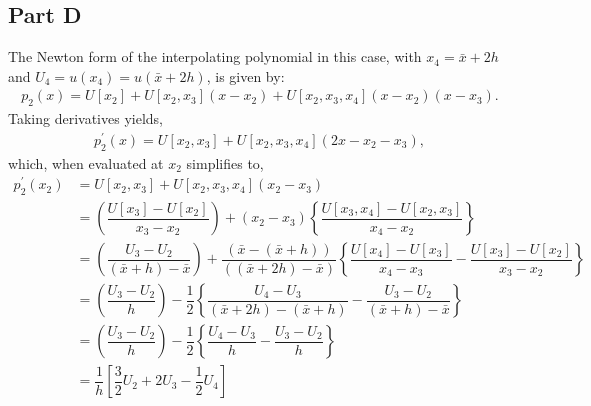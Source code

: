 \documentclass[12pt]{article}
\newcommand{\xbar}{\bar{x}}
\begin{document}
\subsection*{Part D}
The Newton form of the interpolating polynomial in this case, with $x_{4} = \xbar+2h$ and $U_{4} = u(x_{4}) = u(\xbar+2h)$, is given by:
\begin{align}
    p_{2}(x) = U[x_{2}] + U[x_{2}, x_{3}](x-x_{2}) + U[x_{2},x_{3},x_{4}](x-x_{2})(x-x_{3}).
\end{align}
Taking derivatives yields,
\begin{align}
    p_{2}^{\prime}(x) = U[x_{2},x_{3}]+ U[x_{2},x_{3},x_{4}](2x-x_{2}-x_{3}),
\end{align}
which, when evaluated at $x_{2}$ simplifies to,
\begin{subequations}
    \begin{align}
        p_{2}^{\prime}(x_{2}) &= U[x_{2},x_{3}]+ U[x_{2},x_{3},x_{4}](x_{2}-x_{3})\\
        &= \left(\dfrac{U[x_{3}]-U[x_{2}]}{x_{3}-x_{2}}\right)
        +(x_{2}-x_{3})\left\{\dfrac{U[x_{3},x_{4}]-U[x_{2},x_{3}]}{x_{4}-x_{2}}\right\}\\
        &= \left(\dfrac{U_{3}-U_{2}}{(\xbar+h)-\xbar}\right)+\dfrac{(\xbar-(\xbar+h))}{((\xbar+2h)-\xbar)}
        \left\{\dfrac{U[x_{4}]-U[x_{3}]}{x_{4}-x_{3}}-\dfrac{U[x_{3}]-U[x_{2}]}{x_{3}-x_{2}}\right\}\\
        &= \left(\dfrac{U_{3}-U_{2}}{h}\right)-\dfrac{1}{2}
        \left\{\dfrac{U_{4}-U_{3}}{(\xbar+2h)-(\xbar+h)}-\dfrac{U_{3}-U_{2}}{(\xbar+h)-\xbar}\right\}\\
        &= \left(\dfrac{U_{3}-U_{2}}{h}\right)-\dfrac{1}{2}
        \left\{\dfrac{U_{4}-U_{3}}{h}-\dfrac{U_{3}-U_{2}}{h}\right\}\\
        &= \dfrac{1}{h}\left[\dfrac{3}{2}U_{2}+2U_{3}-\dfrac{1}{2}U_{4}\right]
    \end{align}
\end{subequations}
\end{document}
